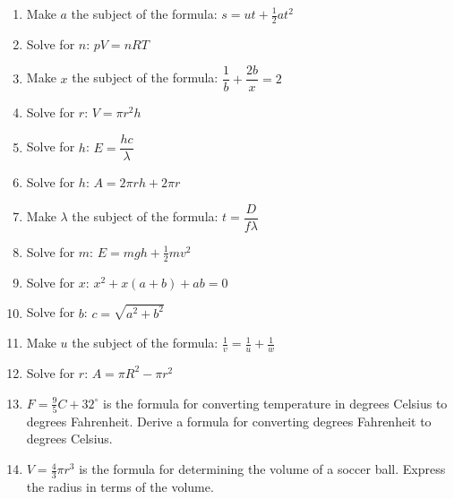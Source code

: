\begin{exercises}{}
{
\begin{enumerate}[itemsep=4pt, label=\textbf{\arabic*}. ] 
\item Make $a$ the subject of the formula: $s=ut+\frac{1}{2}at^{2}$
\item Solve for $n$: $pV=nRT$ 
\item Make $x$ the subject of the formula: $\dfrac{1}{b}+\dfrac{2b}{x}=2$
\item Solve for $r$: $V = \pi r^{2} h$
\item Solve for $h$: $E=\dfrac{hc}{\lambda}$
\item Solve for $h$: $A=2\pi rh + 2 \pi r$
\item Make $\lambda$ the subject of the formula: $t=\dfrac{D}{f \lambda}$
\item Solve for $m$: $E=mgh + \frac{1}{2}mv^{2}$
\item Solve for $x$: $x^2+x(a+b)+ab=0$
\item Solve for $b$: $c=\sqrt{a^2+b^2}$
\item Make $u$ the subject of the formula: $\frac{1}{v}=\frac{1}{u}+\frac{1}{w}$
\item Solve for $r$: $A=\pi R^2 -\pi r^2$
\item $F=\frac{9}{5}C + 32^\circ$ is the formula for converting temperature in degrees Celsius to degrees Fahrenheit. Derive a formula for converting degrees Fahrenheit to degrees Celsius.
\item $V=\frac{4}{3}\pi r^3$ is the formula for determining the volume of a soccer ball. Express the radius in terms of the volume.
\end{enumerate}
}
\end{exercises}


